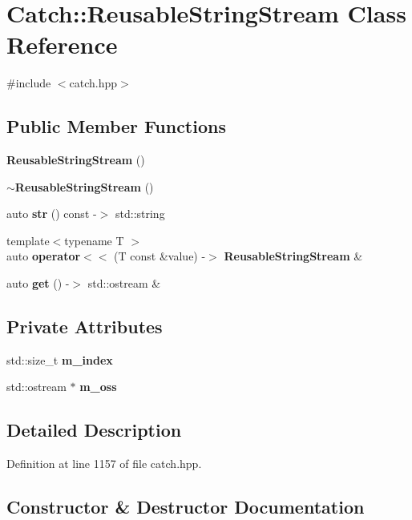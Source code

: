 \section{Catch\+::Reusable\+String\+Stream Class Reference}
\label{class_catch_1_1_reusable_string_stream}


{\ttfamily \#include $<$catch.\+hpp$>$}

\subsection*{Public Member Functions}
\begin{DoxyCompactItemize}
\item 
\textbf{ Reusable\+String\+Stream} ()
\item 
\textbf{ $\sim$\+Reusable\+String\+Stream} ()
\item 
auto \textbf{ str} () const -\/$>$ std\+::string
\item 
{\footnotesize template$<$typename T $>$ }\\auto \textbf{ operator$<$$<$} (T const \&value) -\/$>$ \textbf{ Reusable\+String\+Stream} \&
\item 
auto \textbf{ get} () -\/$>$ std\+::ostream \&
\end{DoxyCompactItemize}
\subsection*{Private Attributes}
\begin{DoxyCompactItemize}
\item 
std\+::size\+\_\+t \textbf{ m\+\_\+index}
\item 
std\+::ostream $\ast$ \textbf{ m\+\_\+oss}
\end{DoxyCompactItemize}


\subsection{Detailed Description}


Definition at line 1157 of file catch.\+hpp.



\subsection{Constructor \& Destructor Documentation}
\mbox{\label{class_catch_1_1_reusable_string_stream_a9b3f8c52b0d2d63ffd825297a9c09781}} 
